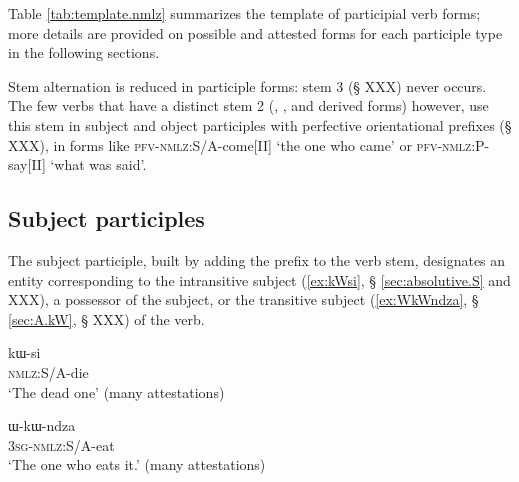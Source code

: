 Table \ref{tab:template.nmlz} summarizes the template of participial verb forms; more details are provided on possible and attested forms for each participle type in the following sections.

\begin{table}[h]
\caption{The template of participial verb forms in Japhug} \centering \label{tab:template.nmlz}
\end{table}

Stem alternation is reduced in participle forms: stem 3 (§ XXX) never occurs. The few verbs that have a distinct stem 2 (, ,  and derived forms) however, use this stem in subject and object participles with perfective orientational prefixes (§ XXX), in forms like  \textsc{pfv}-\textsc{nmlz}:S/A-come[II] `the one who came'
or  \textsc{pfv}-\textsc{nmlz}:P-say[II] `what was said'.
 

\subsection{Subject participles}
The subject participle, built by adding the prefix  to the verb stem, designates an entity corresponding to the intransitive subject (\ref{ex:kWsi}, § \ref{sec:absolutive.S} and XXX), a possessor of the subject, or the transitive subject (\ref{ex:WkWndza}, § \ref{sec:A.kW}, § XXX) of the verb. 

 \begin{exe}
\ex \label{ex:kWsi}
\gll kɯ-si    \\
  \textsc{nmlz}:S/A-die \\
 \glt  `The dead one' (many attestations)
\end{exe}

 \begin{exe} 
\ex \label{ex:WkWndza}
\gll ɯ-kɯ-ndza    \\
  \textsc{3sg}-\textsc{nmlz}:S/A-eat \\
 \glt  `The one who eats it.' (many attestations)
\end{exe}

